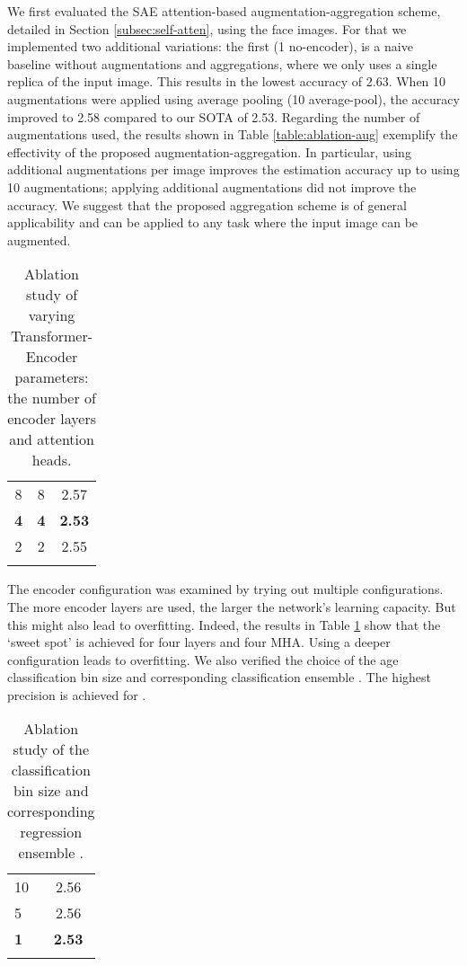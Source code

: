 \documentclass[10pt,journal]{IEEEtran}\usepackage{amsfonts}
\begin{document}
We first evaluated the SAE attention-based augmentation-aggregation scheme,
detailed in Section \ref{subsec:self-atten}, using the face images. For that
we implemented two additional variations: the first (1 no-encoder), is a naive
baseline without augmentations and aggregations, where we only uses a single
replica of the input image. This results in the lowest accuracy of 2.63. When
10 augmentations were applied using average pooling (10 average-pool), the
accuracy improved to 2.58 compared to our SOTA of 2.53. Regarding the number
of augmentations used, the results shown in Table \ref{table:ablation-aug}
exemplify the effectivity of the proposed augmentation-aggregation. In
particular, using additional augmentations per image improves the estimation
accuracy up to using 10 augmentations; applying additional augmentations did
not improve the accuracy. We suggest that the proposed aggregation scheme is
of general applicability and can be applied to any task where the input image
can be augmented.\begin{table}[tbh]
\caption{Ablation study of varying Transformer-Encoder parameters: the number
of encoder layers and attention heads.}\label{tab:encoder_size}
\centering
\strut\vspace*{-\baselineskip}
\begin{tabular}
[c]{@{}ccc}\toprule  &  & \\
\midrule 8 & 8 & 2.57\\
\textbf{4} & \textbf{4} & \textbf{2.53}\\
2 & 2 & 2.55\\
\bottomrule &  &
\end{tabular}
\end{table}

The encoder configuration was examined by trying out multiple configurations.
The more encoder layers are used, the larger the network's learning capacity.
But this might also lead to overfitting. Indeed, the results in Table
\ref{tab:encoder_size} show that the `sweet spot' is achieved for four layers
and four MHA. Using a deeper configuration leads to overfitting. We also
verified the choice of the age classification bin size and corresponding
classification ensemble . The highest precision is achieved for .\begin{table}[tbh]
\caption{Ablation study of the classification bin size and corresponding
regression ensemble .}\label{tab:bin_size}
\centering
\renewcommand{\arraystretch}{1.3}
\begin{tabular}
[c]{@{}lc}\toprule  & \\
\midrule 10 & 2.56\\
5 & 2.56\\
\textbf{1} & \textbf{2.53}\\
\bottomrule &
\end{tabular}
\end{table}
\end{document}
